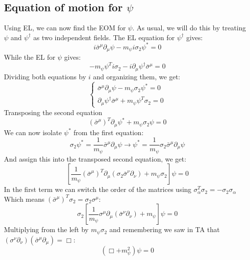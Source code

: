 \documentclass{article}
\begin{document}
\subsection{Equation of motion for $\psi$}
Using EL, we can now find the EOM for $\psi$. As usual, we will do this by treating $\psi$ and $\psi^\dagger$ as two independent fields. The EL equation for $\psi^\dagger$ gives:
\begin{equation}
    i\bar{\sigma}^\mu\partial_\mu \psi - m_\psi i \sigma_2 \psi^* = 0
\end{equation}
While the EL for $\psi$ gives:
\begin{equation}
    - m_\psi\psi^T i \sigma_2 - i \partial_\mu\psi^\dagger \bar{\sigma}^\mu = 0
\end{equation}
Dividing both equations by $i$ and organizing them, we get:
\begin{equation}
\begin{cases}
    \bar{\sigma}^\mu\partial_\mu \psi - m_\psi \sigma_2 \psi^* = 0
    \\
    \partial_\mu\psi^\dagger \bar{\sigma}^\mu + m_\psi\psi^T \sigma_2 = 0
\end{cases}
\end{equation}
Transposing the second equation
\begin{equation}
    \left(\bar{\sigma}^\mu\right)^T \partial_\mu\psi^* + m_\psi\sigma_2 \psi = 0
\end{equation}
We can now isolate $\psi^*$ from the first equation:
\begin{equation}
    \sigma_2 \psi^* = \frac{1}{m_\psi}\bar{\sigma}^\mu\partial_\mu \psi \rightarrow \psi^* = \frac{1}{m_\psi}\sigma_2 \bar{\sigma}^\mu\partial_\mu \psi
\end{equation}
And assign this into the transposed second equation, we get:
\begin{equation}
    \left[
        \frac{1}{m_\psi} \left(\bar{\sigma}^\mu\right)^T \partial_\mu \left(\sigma_2 \bar{\sigma}^\nu\partial_\nu\right) + m_\psi\sigma_2
    \right] \psi = 0
\end{equation}
In the first term we can switch the order of the matrices using $\sigma_\alpha^T \sigma_2 = - \sigma_2\sigma_\alpha$ Which means $\left(\bar{\sigma}^\mu\right)^T\sigma_2 = \sigma_2 \sigma^\mu$:
\begin{equation}
    \sigma_2\left[
        \frac{1}{m_\psi} \sigma^\mu \partial_\mu \left(\bar{\sigma}^\nu\partial_\nu\right) + m_\psi
    \right] \psi = 0
\end{equation}
Multiplying from the left by $m_\psi \sigma_2$ and remembering we saw in TA that $(\sigma^\nu \partial_\nu)(\bar{\sigma}^\mu \partial_\mu) = \Box$:
\begin{equation}
    \left(\Box + m_\psi^2\right)\psi = 0
\end{equation}
\end{document}
